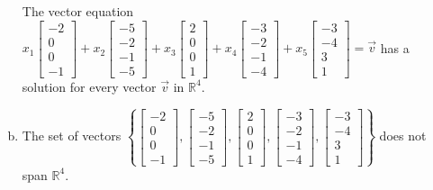 \begin{exerciseAnswer}
\begin{enumerate}[(a)]
\begin{center}\begin{minipage}{0.8\textwidth}
 The vector equation \( x_{1} \left[\begin{array}{c}
-2 \\
0 \\
0 \\
-1
\end{array}\right] + x_{2} \left[\begin{array}{c}
-5 \\
-2 \\
-1 \\
-5
\end{array}\right] + x_{3} \left[\begin{array}{c}
2 \\
0 \\
0 \\
1
\end{array}\right] + x_{4} \left[\begin{array}{c}
-3 \\
-2 \\
-1 \\
-4
\end{array}\right] + x_{5} \left[\begin{array}{c}
-3 \\
-4 \\
3 \\
1
\end{array}\right] =\vec{v}\) has a solution for every vector \(\vec{v}\) in \(\mathbb{R}^4\). 
\end{minipage}\end{center}
    
\item  The set of vectors \( \left\{ \left[\begin{array}{c}
-2 \\
0 \\
0 \\
-1
\end{array}\right] , \left[\begin{array}{c}
-5 \\
-2 \\
-1 \\
-5
\end{array}\right] , \left[\begin{array}{c}
2 \\
0 \\
0 \\
1
\end{array}\right] , \left[\begin{array}{c}
-3 \\
-2 \\
-1 \\
-4
\end{array}\right] , \left[\begin{array}{c}
-3 \\
-4 \\
3 \\
1
\end{array}\right] \right\} \) does not span \(\mathbb{R}^4\). 
\end{enumerate}
    
\end{exerciseAnswer}
    
